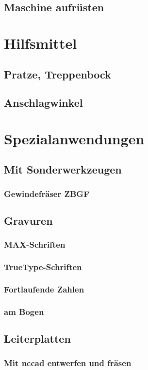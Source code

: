 \documentclass[14pt,a4paper]{book}
\begin{document}
		\subsection{Maschine aufrüsten}
	\section{Hilfsmittel} 
		\subsection{Pratze, Treppenbock} 
		\subsection{Anschlagwinkel} 		 
	\section{Spezialanwendungen} 
		\subsection{Mit Sonderwerkzeugen}
			\subsubsection{Gewindefräser ZBGF} 
		\subsection{Gravuren} 
			\subsubsection{MAX-Schriften} 
			\subsubsection{TrueType-Schriften} 
			\subsubsection{Fortlaufende Zahlen}
			\subsubsection{am Bogen}
		\subsection{Leiterplatten} 
			\subsubsection{Mit nccad entwerfen und fräsen} 
\end{document}
